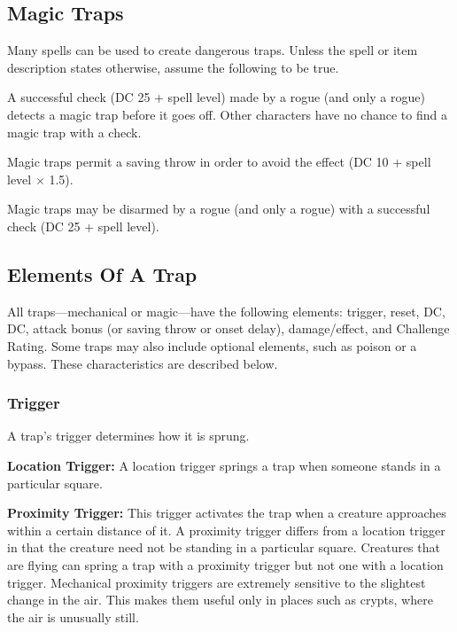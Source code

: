 \subsection{Magic Traps}
Many spells can be used to create dangerous traps. Unless the spell or item description states otherwise, assume the following to be true.

\begin{itemize*}
\item A successful  check (DC 25 + spell level) made by a rogue (and only a rogue) detects a magic trap before it goes off. Other characters have no chance to find a magic trap with a  check.
\item Magic traps permit a saving throw in order to avoid the effect (DC 10 + spell level $\times$ 1.5).
\item Magic traps may be disarmed by a rogue (and only a rogue) with a successful  check (DC 25 + spell level).
\end{itemize*}

\subsection{Elements Of A Trap}
All traps---mechanical or magic---have the following elements: trigger, reset,  DC,  DC, attack bonus (or saving throw or onset delay), damage/effect, and Challenge Rating. Some traps may also include optional elements, such as poison or a bypass. These characteristics are described below.

\subsubsection{Trigger}
A trap’s trigger determines how it is sprung.

\textbf{Location Trigger:} A location trigger springs a trap when someone stands in a particular square.

\textbf{Proximity Trigger:} This trigger activates the trap when a creature approaches within a certain distance of it. A proximity trigger differs from a location trigger in that the creature need not be standing in a particular square. Creatures that are flying can spring a trap with a proximity trigger but not one with a location trigger. Mechanical proximity triggers are extremely sensitive to the slightest change in the air. This makes them useful only in places such as crypts, where the air is unusually still.

